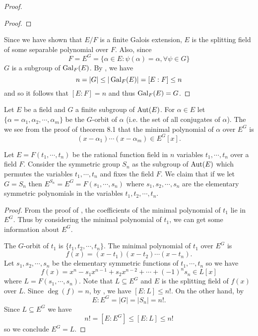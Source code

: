 \documentclass[11pt]{article}
\begin{document}
\begin{proof}
\begin{proof}
    \end{proof}
    Since we have shown that $E/F$ is a finite Galois extension, $E$ is the splitting field of some separable polynomial over $F$. Also, since
    \[F=E^G=\{\alpha\in E:\psi(\alpha)=\alpha,\forall\psi\in G\}\]
    $G$ is a subgroup of $\operatorname{Gal}_F(E)$. By , we have
    \[n=|G|\leq|\operatorname{Gal}_F(E)|=[E:F]\leq n\]
    and so it follows that $[E:F]=n$ and thus $\operatorname{Gal}_F(E)=G$.
    
\end{proof}

\begin{remark}
    Let $E$ be a field and $G$ a finite subgroup of $\operatorname{Aut}(E)$. For $\alpha\in E$ let $\{\alpha=\alpha_1,\alpha_2,\cdots,\alpha_m\}$ be the $G$-orbit of $\alpha$ (i.e. the set of all conjugates of $\alpha$). The we see from the proof of theorem 8.1 that the minimal polynomial of $\alpha$ over $E^G$ is
    \[(x-\alpha_1)\cdots(x-\alpha_m)\in E^G[x].\]
\end{remark}

\begin{example}
    Let $E=F(t_1,\cdots,t_n)$ be the rational function field in $n$ variables $t_1,\cdots,t_n$ over a field $F$. Consider the symmetric group $S_n$ as the subgroup of $\operatorname{Aut}(E)$ which permutes the variables $t_1,\cdots,t_n$ and fixes the field $F$. We claim that if we let $G=S_n$ then $E^{S_n}=E^G=F(s_1,\cdots,s_n)$ where $s_1,s_2,\cdots, s_n$ are the elementary symmetric polynomials in the variables $t_1,t_2,\cdots,t_n$.
\end{example}

\begin{proof}
    From the proof of , the coefficients of the minimal polynomial of $t_1$ lie in $E^G$. Thus by considering the minimal polynomial of $t_1$, we can get some information about $E^G$.

    The $G$-orbit of $t_1$ is $\{t_1,t_2,\cdots,t_n\}$. The minimal polynomial of $t_1$ over $E^G$ is
    \[f(x)=(x-t_1)(x-t_2)\cdots(x-t_n).\]
    Let $s_1,s_2,\cdots,s_n$ be the elementary symmetric functions of $t_1,\cdots,t_n$ so we have
    \[f(x)=x^n-s_1x^{n-1}+s_2x^{n-2}+\cdots+(-1)^ns_n\in L[x]\]
    where $L=F(s_1,\cdots,s_n)$. Note that $L\subseteq E^G$ and $E$ is the splitting field of $f(x)$ over $L$. Since $\deg(f)=n$, by , we have $[E:L]\leq n!$. On the other hand, by 
    \[E:E^G=|G|=|S_n|=n!.\]
    Since $L\subseteq E^G$ we have
    \[n!=[E:E^G]\leq[E:L]\leq n!\]
    so we conclude $E^G=L$.
    
\end{proof}
\end{document}
